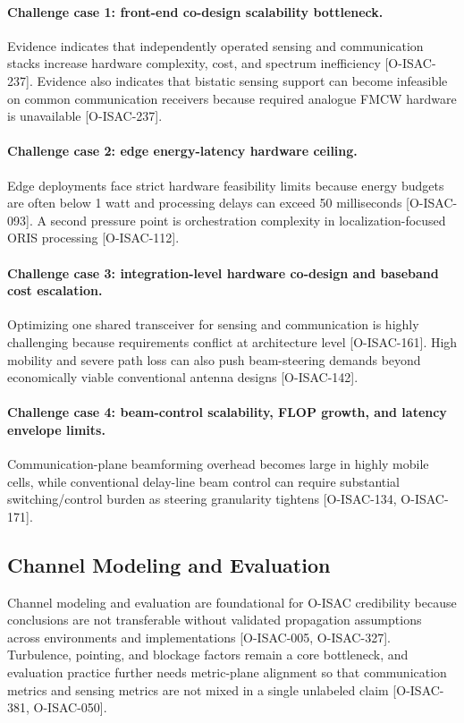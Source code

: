 \paragraph{Challenge case 1: front-end co-design scalability bottleneck.}
Evidence indicates that independently operated sensing and communication stacks increase hardware complexity, cost, and spectrum inefficiency [O-ISAC-237]. Evidence also indicates that bistatic sensing support can become infeasible on common communication receivers because required analogue FMCW hardware is unavailable [O-ISAC-237].

\paragraph{Challenge case 2: edge energy-latency hardware ceiling.}
Edge deployments face strict hardware feasibility limits because energy budgets are often below 1 watt and processing delays can exceed 50 milliseconds [O-ISAC-093]. A second pressure point is orchestration complexity in localization-focused ORIS processing [O-ISAC-112].

\paragraph{Challenge case 3: integration-level hardware co-design and baseband cost escalation.}
Optimizing one shared transceiver for sensing and communication is highly challenging because requirements conflict at architecture level [O-ISAC-161]. High mobility and severe path loss can also push beam-steering demands beyond economically viable conventional antenna designs [O-ISAC-142].

\paragraph{Challenge case 4: beam-control scalability, FLOP growth, and latency envelope limits.}
Communication-plane beamforming overhead becomes large in highly mobile cells, while conventional delay-line beam control can require substantial switching/control burden as steering granularity tightens [O-ISAC-134, O-ISAC-171].

\subsection{Channel Modeling and Evaluation}

Channel modeling and evaluation are foundational for O-ISAC credibility because conclusions are not transferable without validated propagation assumptions across environments and implementations [O-ISAC-005, O-ISAC-327]. Turbulence, pointing, and blockage factors remain a core bottleneck, and evaluation practice further needs metric-plane alignment so that communication metrics and sensing metrics are not mixed in a single unlabeled claim [O-ISAC-381, O-ISAC-050].

